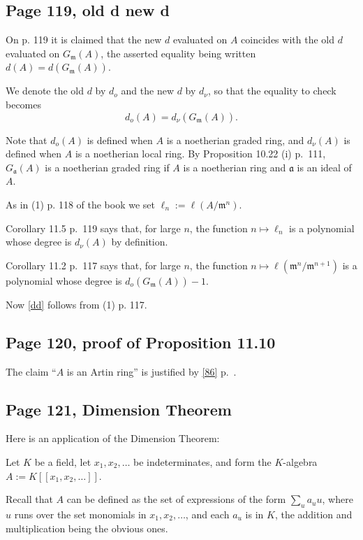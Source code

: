 \documentclass[parskip=half,fontsize=12pt]{scrartcl}%
\newcommand{\mf}{\mathfrak}
\newcommand{\mmm}{\mf m}
\begin{document}
\subsection{Page 119, old d new d}\label{odnd}%

On p. 119 it is claimed that the new $d$ evaluated on $A$ coincides with the old $d$ evaluated on $G_\mmm(A)$, the asserted equality being written $d(A)=d(G_\mmm(A))$. 

We denote the old $d$ by $d_o$ and the new $d$ by $d_\nu$, so that the equality to check becomes 
\begin{equation}\label{dd}
d_o(A)=d_\nu(G_\mmm(A)).
\end{equation}

Note that $d_o(A)$ is defined when $A$ is a noetherian graded ring, and $d_\nu(A)$ is defined when $A$ is a noetherian local ring. By Proposition 10.22 (i) p.~111, $G_{\mf a}(A)$ is a noetherian graded ring if $A$ is a noetherian ring and $\mf a$ is an ideal of $A$.

As in (1) p. 118 of the book we set $\ell_n:=\ell(A/\mf m^n)$. 

Corollary 11.5 p.~119 says that, for large $n$, the function $n\mapsto\ell_n$ is a polynomial whose degree is $d_\nu(A)$ by definition. 

Corollary 11.2 p.~117 says that, for large $n$, the function $n\mapsto\ell(\mf m^n/\mf m^{n+1})$ is a polynomial whose degree is $d_o(G_\mmm(A))-1$.

Now \eqref{dd} follows from (1) p. 117.

\subsection{Page 120, proof of Proposition 11.10}%

The claim ``$A$ is an Artin ring'' is justified by \eqref{86} p.~\pageref{86}.

\subsection{Page 121, Dimension Theorem}\label{dt}%

Here is an application of the Dimension Theorem: 

Let $K$ be a field, let $x_1,x_2,\dots$ be indeterminates, and form the $K$-algebra  $A:=K[[x_1,x_2,\dots]]$. 

Recall that $A$ can be defined as the set of expressions of the form $\sum_ua_uu$, where $u$ runs over the set monomials in $x_1,x_2,\dots$, and each $a_u$ is in $K$, the addition and multiplication being the obvious ones. 
\end{document}
